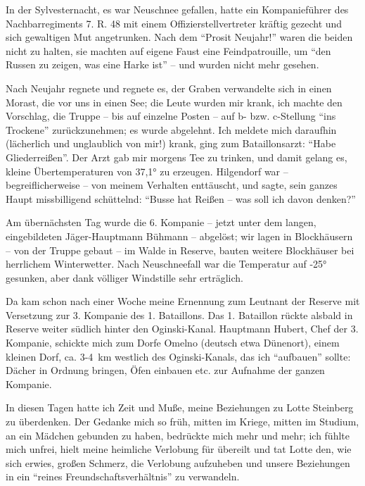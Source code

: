 \documentclass[a5paper,pagesize,10pt,twoside=true]{scrbook}
\begin{document}
In der Sylvesternacht, es war Neuschnee gefallen, hatte ein Kompanieführer des Nachbarregiments 7. R. 48 mit einem Offizierstellvertreter kräftig gezecht und sich gewaltigen Mut angetrunken. Nach dem \enquote{Prosit Neujahr!} waren die beiden nicht zu halten, sie machten auf eigene Faust eine Feindpatrouille, um \enquote{den Russen zu zeigen, was eine Harke ist} -- und wurden nicht mehr gesehen.

Nach Neujahr regnete und regnete es, der Graben verwandelte sich in einen Morast, die  vor uns in einen See; die Leute wurden mir krank, ich machte den Vorschlag, die Truppe -- bis auf einzelne Posten -- auf b- bzw. c-Stellung \enquote{ins Trockene} zurückzunehmen; es wurde abgelehnt. Ich meldete mich daraufhin (lächerlich und unglaublich von mir!) krank, ging zum Bataillonsarzt: \enquote{Habe Gliederreißen}. Der Arzt gab mir morgens Tee zu trinken, und damit gelang es, kleine Übertemperaturen von 37,1° zu erzeugen. Hilgendorf war -- begreiflicherweise -- von meinem Verhalten enttäuscht, und sagte, sein ganzes Haupt missbilligend schüttelnd: \enquote{Busse hat Reißen -- was soll ich davon denken?}

Am übernächsten Tag wurde die 6. Kompanie -- jetzt unter dem langen, eingebildeten Jäger-Hauptmann Bühmann -- abgelöst; wir lagen in Blockhäusern -- von der Truppe gebaut -- im Walde in Reserve, bauten weitere Blockhäuser bei herrlichem Winterwetter. Nach Neuschneefall war die Temperatur auf -25° gesunken, aber dank völliger Windstille sehr erträglich.

Da kam schon nach einer Woche meine Ernennung zum Leutnant der Reserve mit Versetzung zur 3. Kompanie des 1. Bataillons. Das 1. Bataillon rückte alsbald in Reserve weiter südlich hinter den Oginski-Kanal. Hauptmann Hubert, Chef der 3. Kompanie, schickte mich zum Dorfe Omelno (deutsch etwa Dünenort), einem kleinen Dorf, ca. 3-4~km westlich des Oginski-Kanals, das ich \enquote{aufbauen} sollte: Dächer in Ordnung bringen, Öfen einbauen etc. zur Aufnahme der ganzen Kompanie.

In diesen Tagen hatte ich Zeit und Muße, meine Beziehungen zu Lotte Steinberg zu überdenken. Der Gedanke mich so früh, mitten im Kriege, mitten im Studium, an ein Mädchen gebunden zu haben, bedrückte mich mehr und mehr; ich fühlte mich unfrei, hielt meine heimliche Verlobung für übereilt und tat Lotte den, wie sich erwies, großen Schmerz, die Verlobung aufzuheben und unsere Beziehungen in ein \enquote{reines Freundschaftsverhältnis} zu verwandeln.
\end{document}
